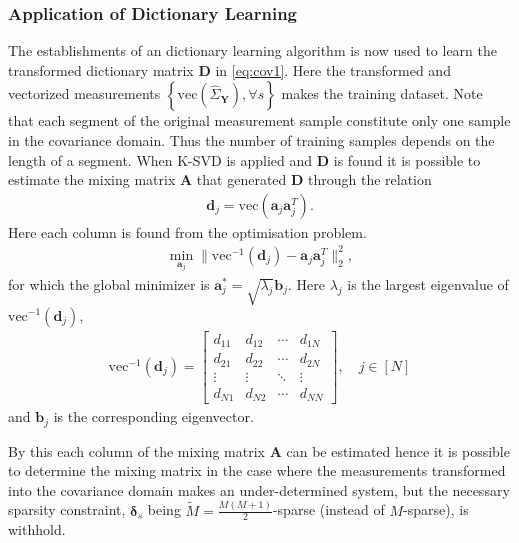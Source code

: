 \subsubsection{Application of Dictionary Learning}
The establishments of an dictionary learning algorithm is now used to learn the transformed dictionary matrix $\textbf{D}$ in \eqref{eq:cov1}. 
Here the transformed and vectorized measurements $\left\{ \text{vec}\left( \hat{\Sigma}_\textbf{Y}\right), \forall s\right\}$ makes the training dataset. 
Note that each segment of the original measurement sample constitute only one sample in the covariance domain. 
Thus the number of training samples depends on the length of a segment.     
When K-SVD is applied and $\mathbf{D}$ is found it is possible to estimate the mixing matrix $\mathbf{A}$ that generated $\textbf{D}$ through the relation 
\begin{align*}
\mathbf{d}_j = \text{vec}(\mathbf{a}_j \mathbf{a}_j^T).
\end{align*}
Here each column is found from the optimisation problem.
\begin{align*}
\min_{\textbf{a}_j} \| \text{vec}^{-1}(\textbf{d}_j) -\textbf{a}_j\textbf{a}_j^T\|_2^2, 
\end{align*}
for which the global minimizer is $\mathbf{a}^{\ast}_j=\sqrt{\lambda_j} \textbf{b}_j$. 
Here $\lambda_j$ is the largest eigenvalue of $\text{vec}^{-1}(\textbf{d}_j)$,
\begin{align*}
\text{vec}^{-1}(\textbf{d}_j) = 
\begin{bmatrix}
d_{11} & d_{12} & \cdots & d_{1N} \\
d_{21} & d_{22} & \cdots & d_{2N} \\
\vdots & \vdots & \ddots & \vdots \\
d_{N1} & d_{N2} & \cdots & d_{NN}
\end{bmatrix}, \quad j \in [N]
\end{align*}
and $\textbf{b}_j$ is the corresponding eigenvector.

By this each column of the mixing matrix $\textbf{A}$ can be estimated hence it is possible to determine the mixing matrix in the case where the measurements transformed into the covariance domain makes an under-determined system, but the necessary sparsity constraint, $\boldsymbol{\delta}_s$ being $\widetilde{M} = \frac{M(M+1)}{2}$-sparse (instead of $M$-sparse), is withhold.    




